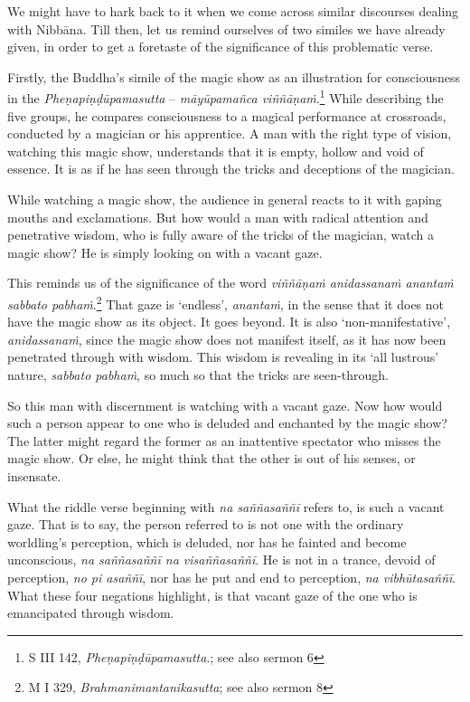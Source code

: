We might have to hark back to it when we come across similar discourses dealing with Nibbāna. Till then, let us remind ourselves of two similes we have already given, in order to get a foretaste of the significance of this problematic verse.

\enlargethispage{\baselineskip}

Firstly, the Buddha's simile of the magic show as an illustration for consciousness in the \emph{Pheṇapiṇḍūpamasutta} -- \emph{māyūpamañca viññāṇaṁ}.\footnote{S III 142, \emph{Pheṇapiṇḍūpamasutta}.; see also sermon 6} While describing the five groups, he compares consciousness to a magical performance at crossroads, conducted by a magician or his apprentice. A man with the right type of vision, watching this magic show, understands that it is empty, hollow and void of essence. It is as if he has seen through the tricks and deceptions of the magician.

While watching a magic show, the audience in general reacts to it with gaping mouths and exclamations. But how would a man with radical attention and penetrative wisdom, who is fully aware of the tricks of the magician, watch a magic show? He is simply looking on with a vacant gaze.

This reminds us of the significance of the word \emph{viññāṇaṁ anidassanaṁ anantaṁ sabbato pabhaṁ}.\footnote{M I 329, \emph{Brahmanimantanikasutta}; see also sermon 8} That gaze is `endless', \emph{anantaṁ}, in the sense that it does not have the magic show as its object. It goes beyond. It is also `non-manifestative', \emph{anidassanaṁ}, since the magic show does not manifest itself, as it has now been penetrated through with wisdom. This wisdom is revealing in its `all lustrous' nature, \emph{sabbato pabhaṁ}, so much so that the tricks are seen-through.

So this man with discernment is watching with a vacant gaze. Now how would such a person appear to one who is deluded and enchanted by the magic show? The latter might regard the former as an inattentive spectator who misses the magic show. Or else, he might think that the other is out of his senses, or insensate.

What the riddle verse beginning with \emph{na saññasaññī} refers to, is such a vacant gaze. That is to say, the person referred to is not one with the ordinary worldling's perception, which is deluded, nor has he fainted and become unconscious, \emph{na saññasaññī na visaññasaññī}. He is not in a trance, devoid of perception, \emph{no pi asaññī}, nor has he put and end to perception, \emph{na vibhūtasaññī}. What these four negations highlight, is that vacant gaze of the one who is emancipated through wisdom.

